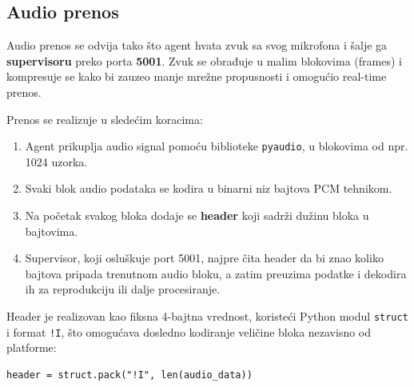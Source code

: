 \documentclass[a4paper,12pt]{article}
\begin{document}
\subsection{Audio prenos}

Audio prenos se odvija tako što agent hvata zvuk sa svog mikrofona i šalje ga \textbf{supervisoru} preko porta \textbf{5001}. Zvuk se obrađuje u malim blokovima (frames) i kompresuje se kako bi zauzeo manje mrežne propusnosti i omogućio real-time prenos.

Prenos se realizuje u sledećim koracima:
\begin{enumerate}
    \item Agent prikuplja audio signal pomoću biblioteke \texttt{pyaudio}, u blokovima od npr. 1024 uzorka.
    \item Svaki blok audio podataka se kodira u binarni niz bajtova PCM tehnikom.
    \item Na početak svakog bloka dodaje se \textbf{header} koji sadrži dužinu bloka u bajtovima.
    \item Supervisor, koji osluškuje port 5001, najpre čita header da bi znao koliko bajtova pripada trenutnom audio bloku, a zatim preuzima podatke i dekodira ih za reprodukciju ili dalje procesiranje.
\end{enumerate}

Header je realizovan kao fiksna 4-bajtna vrednost, koristeći Python modul \texttt{struct} i format \texttt{!I}, što omogućava dosledno kodiranje veličine bloka nezavisno od platforme:

\begin{verbatim}
header = struct.pack("!I", len(audio_data))
\end{verbatim}
\end{document}
